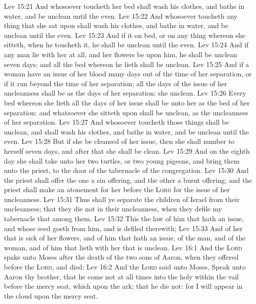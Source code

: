 \vs Lev 15:21 And whosoever toucheth her bed shall wash his clothes, and bathe  in water, and be unclean until the even.
\vs Lev 15:22 And whosoever toucheth any thing that she sat upon shall wash his clothes, and bathe  in water, and be unclean until the even.
\vs Lev 15:23 And if it  on  bed, or on any thing whereon she sitteth, when he toucheth it, he shall be unclean until the even.
\vs Lev 15:24 And if any man lie with her at all, and her flowers be upon him, he shall be unclean seven days; and all the bed whereon he lieth shall be unclean.
\vs Lev 15:25 And if a woman have an issue of her blood many days out of the time of her separation, or if it run beyond the time of her separation; all the days of the issue of her uncleanness shall be as the days of her separation: she  unclean.
\vs Lev 15:26 Every bed whereon she lieth all the days of her issue shall be unto her as the bed of her separation: and whatsoever she sitteth upon shall be unclean, as the uncleanness of her separation.
\vs Lev 15:27 And whosoever toucheth those things shall be unclean, and shall wash his clothes, and bathe  in water, and be unclean until the even.
\vs Lev 15:28 But if she be cleansed of her issue, then she shall number to herself seven days, and after that she shall be clean.
\vs Lev 15:29 And on the eighth day she shall take unto her two turtles, or two young pigeons, and bring them unto the priest, to the door of the tabernacle of the congregation.
\vs Lev 15:30 And the priest shall offer the one  a sin offering, and the other  a burnt offering; and the priest shall make an atonement for her before the \textsc{Lord} for the issue of her uncleanness.
\vs Lev 15:31 Thus shall ye separate the children of Israel from their uncleanness; that they die not in their uncleanness, when they defile my tabernacle that  among them.
\vs Lev 15:32 This  the law of him that hath an issue, and  whose seed goeth from him, and is defiled therewith;
\vs Lev 15:33 And of her that is sick of her flowers, and of him that hath an issue, of the man, and of the woman, and of him that lieth with her that is unclean.
\vs Lev 16:1 And the \textsc{Lord} spake unto Moses after the death of the two sons of Aaron, when they offered before the \textsc{Lord}, and died;
\vs Lev 16:2 And the \textsc{Lord} said unto Moses, Speak unto Aaron thy brother, that he come not at all times into the holy  within the vail before the mercy seat, which  upon the ark; that he die not: for I will appear in the cloud upon the mercy seat.
